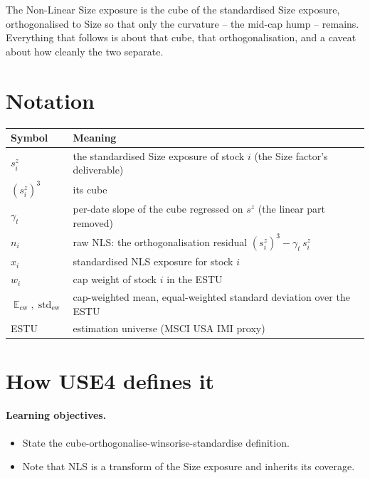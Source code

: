 \documentclass[11pt]{article}
\theoremstyle{definition}
\theoremstyle{plain}
\theoremstyle{remark}
\DeclareMathOperator{\std}{std}
\DeclareMathOperator*{\avg}{\mathbb{E}}
\begin{document}
\begin{keyresult}
The Non-Linear Size exposure is the cube of the standardised Size exposure, orthogonalised to Size so that only the curvature -- the mid-cap hump -- remains. Everything that follows is about that cube, that orthogonalisation, and a caveat about how cleanly the two separate.
\end{keyresult}

\section*{Notation}

\begin{center}
\begin{tabular}{@{}ll@{}}
\toprule
Symbol & Meaning \\
\midrule
$s^{z}_i$ & the standardised Size exposure of stock $i$ (the Size factor's deliverable) \\
$(s^{z}_i)^{3}$ & its cube \\
$\gamma_t$ & per-date slope of the cube regressed on $s^{z}$ (the linear part removed) \\
$n_i$ & raw NLS: the orthogonalisation residual $(s^{z}_i)^{3} - \gamma_t\,s^{z}_i$ \\
$x_i$ & standardised NLS exposure for stock $i$ \\
$w_i$ & cap weight of stock $i$ in the ESTU \\
$\avg_{\text{cw}}, \std_{\text{ew}}$ & cap-weighted mean, equal-weighted standard deviation over the ESTU \\
ESTU & estimation universe (MSCI USA IMI proxy) \\
\bottomrule
\end{tabular}
\end{center}

\section{How USE4 defines it}\label{sec:def}

\paragraph{Learning objectives.}
\begin{itemize}[leftmargin=1.4em,topsep=2pt]
  \item State the cube-orthogonalise-winsorise-standardise definition.
  \item Note that NLS is a transform of the Size exposure and inherits its coverage.
\end{itemize}
\end{document}
